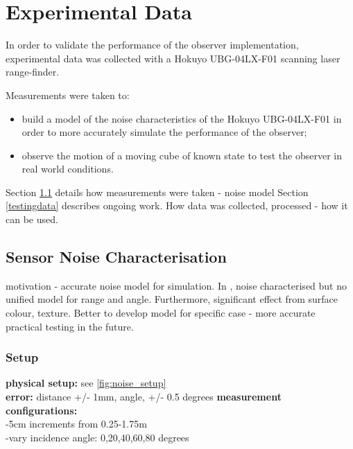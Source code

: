 \chapter{Experimental Data}
In order to validate the performance of the observer implementation, experimental data was collected with a Hokuyo UBG-04LX-F01 scanning laser range-finder.

Measurements were taken to:
\begin{itemize}
\item build a model of the noise characteristics of the Hokuyo UBG-04LX-F01 in order to more accurately simulate the performance of the observer;
\item observe the motion of a moving cube of known state to test the observer in real world conditions.
\end{itemize}

Section \ref{sensor_noise} details how measurements were taken - noise model 
Section \ref{testingdata} describes ongoing work. How data was collected, processed - how it can be used. 

\section{Sensor Noise Characterisation} \label{sensor_noise}
motivation - accurate noise model for simulation. In \cite{park2010characterization}, noise characterised but no unified model for range and angle. Furthermore, significant effect from surface colour, texture. Better to develop model for specific case - more accurate practical testing in the future.

	\subsection{Setup}
		\textbf{physical setup:} see \ref{fig:noise_setup}\\
		\textbf{error:} distance +/- 1mm, angle, +/- 0.5 degrees
		\textbf{measurement configurations:}\\
			-5cm increments from 0.25-1.75m\\
			-vary incidence angle: 0,20,40,60,80 degrees
		 
